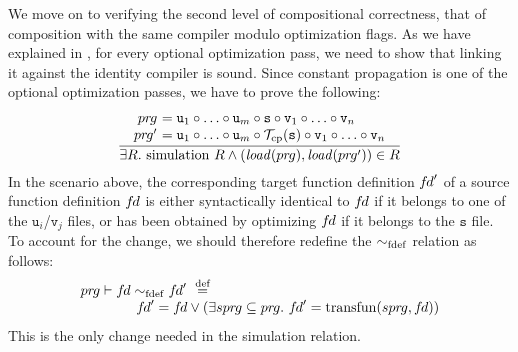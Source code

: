 We move on to verifying the second level of compositional correctness, that of composition with the same compiler modulo optimization flags.
As we have explained in , for every optional optimization pass, we need to show that linking it against the identity compiler is sound.
Since constant propagation is one of the optional optimization passes, we have to prove the following:
\[
\frac{
\begin{array}{@{}r@{~}l@{}}
\vprg &= \mathtt{u}_1\circ \ldots \circ \mathtt{u}_m\circ\mathtt{s} \circ \mathtt{v}_1\circ \ldots \circ \mathtt{v}_n\\
\vprg' &= \mathtt{u}_1\circ \ldots \circ \mathtt{u}_m\circ\mathcal{T}_{\rm cp}(\mathtt{s}) \circ \mathtt{v}_1\circ \ldots \circ \mathtt{v}_n
\end{array}
}
{\exists R.~ \mathrm{simulation}~R \land 
(\rtlload(\vprg),\rtlload(\vprg'))\in R
}
\]
In the scenario above, the corresponding target function definition ${f\hspace*{-1pt}d}'$ of a source function definition ${f\hspace*{-1pt}d}$
is either syntactically identical to ${f\hspace*{-1pt}d}$ if it belongs to one of the $\mathtt{u}_i$/$\mathtt{v}_j$ files, 
or has been obtained by optimizing ${f\hspace*{-1pt}d}$ if it belongs to the $\mathtt{s}$ file.
To account for the change, we should therefore redefine the $\sim_{\mathrm{fdef}}$ relation as follows:
\[ 
\begin{array}{l}
{pr\hspace*{-1pt}g} \vdash {f\hspace*{-1pt}d} \sim_{\mathrm{fdef}} {f\hspace*{-1pt}d}' ~\stackrel{\text{def}}{=}~ 
\\\qquad\qquad
{f\hspace*{-1pt}d}' = {f\hspace*{-1pt}d} \lor (\exists {spr\hspace*{-1pt}g} \subseteq {pr\hspace*{-1pt}g}.~ {f\hspace*{-1pt}d}' = \mathrm{transfun}({spr\hspace*{-1pt}g},{f\hspace*{-1pt}d}))
\end{array}
\]
This is the only change needed in the simulation relation.





